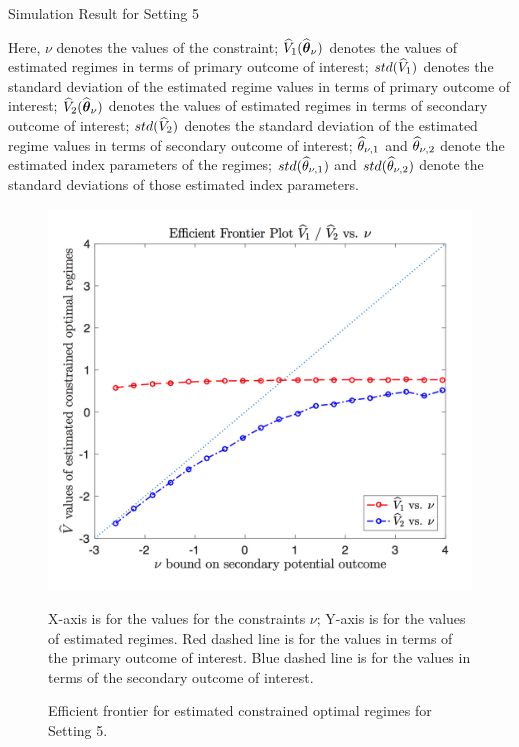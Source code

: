 \begin{table}[!htbp]
	\caption {Simulation Result for Setting 5}
	\centering
	{\tt
		
	}
	\justify
	Here, $\nu$ denotes the values of the constraint; $\widehat{V}_1(\widehat{\boldsymbol{\theta}}_{\nu})$ denotes the values of estimated regimes in terms of primary outcome of interest; $std(\widehat{V}_1)$ denotes the standard deviation of the estimated regime values in terms of primary outcome of interest; $\widehat{V}_2(\widehat{\boldsymbol{\theta}}_{\nu})$ denotes the values of estimated regimes in terms of secondary outcome of interest; $std(\widehat{V}_2)$ denotes the standard deviation of the estimated regime values in terms of secondary outcome of interest; $\widehat{\theta}_{\nu,1}$ and $\widehat{\theta}_{\nu,2}$ denote the estimated index parameters of the regimes; $std(\widehat{\theta}_{\nu,1})$ and $std(\widehat{\theta}_{\nu,2})$ denote the standard deviations of those estimated index parameters.	
\end{table} 
\begin{figure}[!htb]
	\centering
	\includegraphics[width=.9\linewidth]{./Chapter-1/figs/efficient_plot5.png}
	\caption{Efficient frontier for estimated constrained optimal regimes for Setting 5.}
	\label{fig:5}
	\justify
X-axis is for the values for the constraints $\nu$; Y-axis is for the values of estimated regimes. Red dashed line is for the values in terms of the primary outcome of interest. Blue dashed line is for the values in terms of the secondary outcome of interest.
\end{figure}
